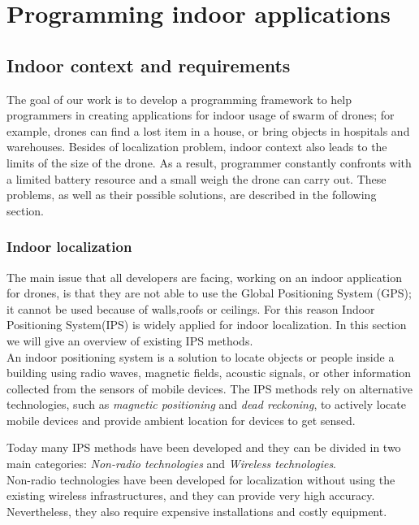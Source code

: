 \chapter{Programming indoor applications}
\label{cap3}



\section {Indoor context and requirements}

The goal of our work is to develop a programming framework to help programmers in creating applications for indoor usage of swarm of drones; for example, drones can find a lost item in a house, or bring objects in hospitals and warehouses.
Besides of localization problem, indoor context also leads to the limits of the size of the drone. As a result, programmer constantly confronts with a limited battery resource and a small weigh the drone can carry out. These problems, as well as their possible solutions, are described in the following section.

\subsection{Indoor localization}

The main issue that all developers are facing, working on an indoor application for drones, is that they are not able to use the Global Positioning System (GPS); it cannot be used because of walls,roofs or ceilings.
For this reason Indoor Positioning System(IPS) is widely applied for indoor localization. In this section we will give an overview of existing IPS methods.  
\\

An indoor positioning system is a solution to locate objects or people inside a building using radio waves, magnetic fields, acoustic signals, or other information collected from the sensors of mobile devices.
The IPS methods rely on alternative technologies, such as \textit{magnetic positioning} and \textit{dead reckoning}, to actively locate mobile devices and provide ambient location for devices to get sensed.

Today many IPS methods have been developed and they can be divided in two main categories: \textit{Non-radio technologies} and \textit{Wireless technologies}.
\\

Non-radio technologies have been developed for localization without using the existing wireless infrastructures, and they can provide very high accuracy.
Nevertheless, they also require expensive installations and costly equipment.
\\

